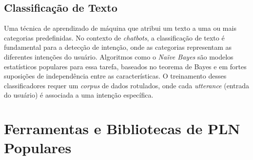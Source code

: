 \documentclass[14pt,a4paper,oneside]{book}
\begin{document}
\subsection{Classificação de Texto}
Uma técnica de aprendizado de máquina que atribui um texto a uma ou mais categorias predefinidas. No contexto de \textit{chatbots}, a classificação de texto é fundamental para a detecção de intenção, onde as categorias representam as diferentes intenções do usuário. Algoritmos como o \textit{Naïve Bayes} são modelos estatísticos populares para essa tarefa, baseados no teorema de Bayes e em fortes suposições de independência entre as características. O treinamento desses classificadores requer um \textit{corpus} de dados rotulados, onde cada \textit{utterance} (entrada do usuário) é associada a uma intenção específica.

\section{Ferramentas e Bibliotecas de PLN Populares}
\end{document}
